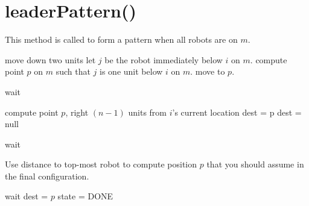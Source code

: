 \documentclass[preprint,10pt]{elsarticle}
\begin{document}
\section{leaderPattern()} 
This method is called to form a pattern when all robots are on $m$.
\begin{algorithm}
\begin{algorithmic}[1]
		\State move down two units
	\EndIf
	\State let $j$ be the robot immediately below $i$ on $m$.
	\State compute point $p$ on $m$ such that $j$ is one
	unit below $i$ on $m$.
	\State move to $p$.

		\State wait
	\EndWhile

		\State compute point $p$, right $(n-1)$ units from $i$'s current location
		\State dest = p
	\Else
		dest = null
	\EndIf

		\State wait
	\EndWhile

	\State Use distance to top-most robot to compute position $p$ that you
	should assume in the final configuration.

		\State wait
	\EndWhile
	\State dest = $p$
	\State state = DONE


\EndProcedure
\end{algorithmic}
\end{algorithm}

 

\end{document}
